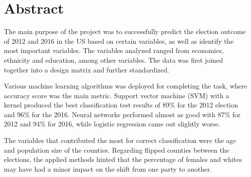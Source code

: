 \section*{Abstract}
\setlength{\parindent}{0cm}

The main purpose of the project was to successfully predict the election outcome of 2012 and 2016 in the US based on certain variables, as well as identify the most important variables. The variables analyzed ranged from economics, ethnicity and education, among other variables. The data was first joined together into a design matrix and further standardized.
\\
\par
Various machine learning algorithms was deployed for completing the task, where accuracy score was the main metric. Support vector machine (SVM) with a kernel produced the best classification test results of 89\% for the 2012 election and 96\% for the 2016. Neural networks performed almost as good with 87\% for 2012 and 94\% for 2016, while logistic regression came out slightly worse.
\\
\par
The variables that contributed the most for correct classification were the age and population size of the counties. Regarding flipped counties between the elections, the applied methods hinted that the percentage of females and whites may have had a minor impact on the shift from one party to another.
  